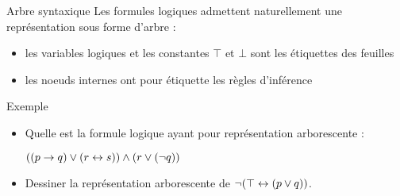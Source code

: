 \documentclass[10pt]{beamer}
\begin{document}
\begin{frame}{\Ctitle}{\stitle}
    \begin{block}{Arbre syntaxique}
        Les formules logiques admettent naturellement une représentation sous forme d'arbre :
        \begin{itemize}
            \item<2-> les variables logiques et les constantes $\top$ et $\bot$ sont les étiquettes des feuilles
            \item<3-> les noeuds internes ont pour étiquette les règles d'inférence
        \end{itemize}
    \end{block}
\end{frame}

\begin{frame}{\Ctitle}{\stitle}
    \begin{exampleblock}{Exemple}
        \begin{itemize}
        \item Quelle est la formule logique ayant pour représentation arborescente :
        \begin{center}
        \end{center}
        \textcolor{OliveGreen}{$ ((p \to q) \vee (r \leftrightarrow s)) \wedge (r \vee (\neg q)) $}
        \item<3-> Dessiner la représentation arborescente de $ \neg(\top \leftrightarrow (p \vee q))$.
    \end{itemize}
    \end{exampleblock}
\end{frame}
\end{document}
